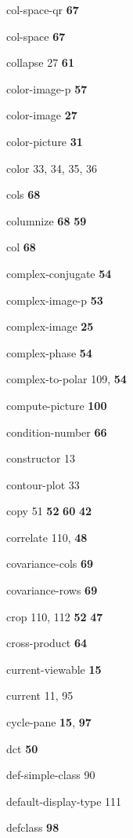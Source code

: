 \begin{theindex}
\item {\ptt col-space-qr} {\bf 67}
\item {\ptt col-space} {\bf 67}
\item {\ptt collapse} 27
 {\bf 61}
\item {\ptt color-image-p} {\bf 57}
\item {\ptt color-image} {\bf 27}
\item {\ptt color-picture} {\bf 31}
\item {\ptt color} 33, 34, 35, 36
\item {\ptt cols} {\bf 68}
\item {\ptt columnize} {\bf 68}
 {\bf 59}
\item {\ptt col} {\bf 68}
\item {\ptt complex-conjugate} {\bf 54}
\item {\ptt complex-image-p} {\bf 53}
\item {\ptt complex-image} {\bf 25}
\item {\ptt complex-phase}
 {\bf 54}
\item {\ptt complex-to-polar} 109, {\bf 54}
\item {\ptt compute-picture} {\bf 100}
\item {\ptt condition-number} {\bf 66}
\item {\ptt constructor} 13
\item {\ptt contour-plot} 33
\item {\ptt copy} 51
 {\bf 52}
 {\bf 60}
 {\bf 42}
\item {\ptt correlate} 110, {\bf 48}
\item {\ptt covariance-cols} {\bf 69}
\item {\ptt covariance-rows} {\bf 69}
\item {\ptt crop} 110, 112
 {\bf 52}
 {\bf 47}
\item {\ptt cross-product}
 {\bf 64}
\item {\ptt current-viewable} {\bf 15}
\item {\ptt current} 11, 95
\item {\ptt cycle-pane} {\bf 15}, {\bf 97}
\item {\ptt dct} {\bf 50}
\item {\ptt def-simple-class} 90
\item {\ptt default-display-type} 111
\item {\ptt defclass} {\bf 98}

\end{theindex}
